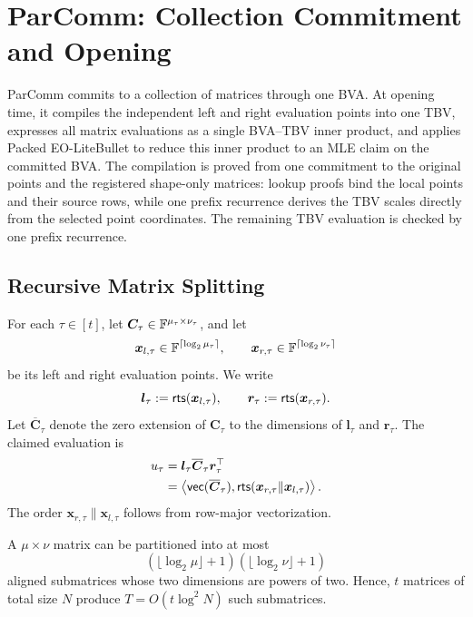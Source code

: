 \section{ParComm: Collection Commitment and Opening}
\label{sec:parcomm}

ParComm commits to a collection of matrices through one BVA.  At opening time,
it compiles the independent left and right evaluation points into one TBV,
expresses all matrix evaluations as a single BVA--TBV inner product, and applies
Packed EO-LiteBullet to reduce this inner product to an MLE claim on the
committed BVA.  The compilation is proved from one commitment to the original
points and the registered shape-only matrices: lookup proofs bind the local
points and their source rows, while one prefix recurrence derives the TBV
scales directly from the selected point coordinates.
The remaining TBV evaluation is checked by one prefix recurrence.

\subsection{Recursive Matrix Splitting}
\label{sec:matrix-splitting}

For each $\tau\in[t]$, let
$\bm C_\tau\in{\mathbb{F}}^{\mu_\tau\times\nu_\tau}$, and let
\[
  \bm x_{l,\tau}\in{\mathbb{F}}^{\lceil\log_2\mu_\tau\rceil},
  \qquad
  \bm x_{r,\tau}\in{\mathbb{F}}^{\lceil\log_2\nu_\tau\rceil}
\]
be its left and right evaluation points.  We write
\[
  \bm l_\tau:={\sf rts}(\bm x_{l,\tau}),
  \qquad
  \bm r_\tau:={\sf rts}(\bm x_{r,\tau}).
\]
Let $\overline{\bm C}_\tau$ denote the zero extension of $\bm C_\tau$ to the
dimensions of $\bm l_\tau$ and $\bm r_\tau$.  The claimed evaluation is
\begin{equation}
\label{eq:individual-evaluations}
\begin{aligned}
  u_\tau
  &=\bm l_\tau\overline{\bm C}_\tau\bm r_\tau^{\top}\\
  &=\left\langle
      {\sf vec}(\overline{\bm C}_\tau),
      {\sf rts}(\bm x_{r,\tau}\|\bm x_{l,\tau})
    \right\rangle .
\end{aligned}
\end{equation}
The order $\bm x_{r,\tau}\|\bm x_{l,\tau}$ follows from row-major
vectorization.

\begin{lemma}
\label{lemma:mat-splitting}
A $\mu\times\nu$ matrix can be partitioned into at most
\[
  (\lfloor\log_2\mu\rfloor+1)
  (\lfloor\log_2\nu\rfloor+1)
\]
  aligned submatrices whose two dimensions are powers of two.  Hence, $t$
matrices of total size $N$ produce
$T=O(t\log^2 N)$ such submatrices.
\end{lemma}

